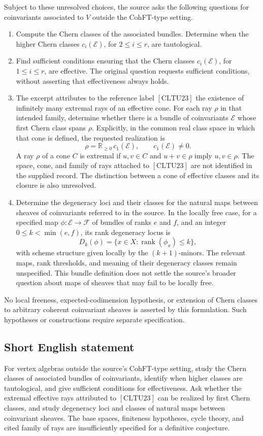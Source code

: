 \documentclass[11pt]{article}
\newcommand{\R}{\mathbb{R}}
\begin{document}
Subject to these unresolved choices, the source asks the following questions for coinvariants associated to \(V\) outside the CohFT-type setting.
\begin{enumerate}
\item Compute the Chern classes of the associated bundles. Determine when the higher Chern classes \(c_i(\mathcal E)\), for \(2\leq i\leq r\), are tautological.
\item Find sufficient conditions ensuring that the Chern classes \(c_i(\mathcal E)\), for \(1\leq i\leq r\), are effective. The original question requests sufficient conditions, without asserting that effectiveness always holds.
\item The excerpt attributes to the reference label \([\mathrm{CLTU23}]\) the existence of infinitely many extremal rays of an effective cone. For each ray \(\rho\) in that intended family, determine whether there is a bundle of coinvariants \(\mathcal E\) whose first Chern class spans \(\rho\). Explicitly, in the common real class space in which that cone is defined, the requested realization is
\[
\rho=\R_{\geq 0}\,c_1(\mathcal E),\qquad c_1(\mathcal E)\neq 0.
\]
A ray \(\rho\) of a cone \(C\) is extremal if \(u,v\in C\) and \(u+v\in\rho\) imply \(u,v\in\rho\). The space, cone, and family of rays attached to \([\mathrm{CLTU23}]\) are not identified in the supplied record. The distinction between a cone of effective classes and its closure is also unresolved.
\item Determine the degeneracy loci and their classes for the natural maps between sheaves of coinvariants referred to in the source. In the locally free case, for a specified map \(\phi:\mathcal E\to\mathcal F\) of bundles of ranks \(e\) and \(f\), and an integer \(0\leq k<\min(e,f)\), its rank degeneracy locus is
\[
D_k(\phi)=\{x\in X:\operatorname{rank}(\phi_x)\leq k\},
\]
with scheme structure given locally by the \((k+1)\)-minors. The relevant maps, rank thresholds, and meaning of their degeneracy classes remain unspecified. This bundle definition does not settle the source's broader question about maps of sheaves that may fail to be locally free.
\end{enumerate}
No local freeness, expected-codimension hypothesis, or extension of Chern classes to arbitrary coherent coinvariant sheaves is asserted by this formulation. Such hypotheses or constructions require separate specification.
\subsection{Short English statement}
For vertex algebras outside the source's CohFT-type setting, study the Chern classes of associated bundles of coinvariants, identify when higher classes are tautological, and give sufficient conditions for effectiveness. Ask whether the extremal effective rays attributed to \([\mathrm{CLTU23}]\) can be realized by first Chern classes, and study degeneracy loci and classes of natural maps between coinvariant sheaves. The base spaces, finiteness hypotheses, cycle theory, and cited family of rays are insufficiently specified for a definitive conjecture.
\end{document}
